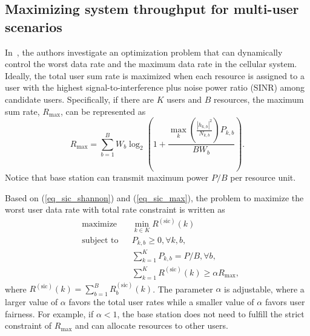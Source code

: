 \subsection{Maximizing system throughput for multi-user scenarios}
\label{sec_dynamic_ra}

In~\cite{cite_docomo2}, the authors investigate an optimization problem that can dynamically control the worst data rate and the maximum data rate in the cellular system. Ideally, the total user sum rate is maximized when each resource is assigned to a user with the highest signal-to-interference plus noise power ratio (SINR) among candidate users. Specifically, if there are $K$ users and $B$ resources, the maximum sum rate, $R_{\text{max}}$, can be represented as
\begin{equation}
\label{eq_sic_max}
R_{\text{max}}=\sum_{b=1}^B W_b \log_2 \left(1+\frac{\max\limits_{k} \left(\frac{|h_{k, b}|^2}{N_{k, b}}\right) P_{k, b}}{BW_b} \right).
\end{equation}
Notice that base station can transmit maximum power $P/B$ per resource unit.

Based on (\ref{eq_sic_shannon}) and (\ref{eq_sic_max}), the problem to maximize the worst user data rate with total rate constraint is written as
\begin{equation}
\label{eq_opt_fair}
\begin{aligned}
& \text{maximize}      & & \min_{k\in K} R^{(\text{sic})}(k) \\
& \text{subject to}     & & P_{k,b} \geq 0, \forall k, b, \\
&                              & & \sum_{k=1}^K P_{k,b}=P/B, \forall b, \\
&                              & & \sum_{k=1}^K R^{(\text{sic})}(k) \geq \alpha R_{\text{max}},
\end{aligned}
\end{equation}
where $R^{(\text{sic})}(k)=\sum_{b=1}^B R_b^{(\text{sic})}(k)$. The parameter $\alpha$ is adjustable, where a larger value of $\alpha$ favors the total user rates while a smaller value of $\alpha$ favors user fairness. For example, if $\alpha <1$, the base station does not need to fulfill the strict constraint of $R_{\text{max}}$ and can allocate resources to other users.

